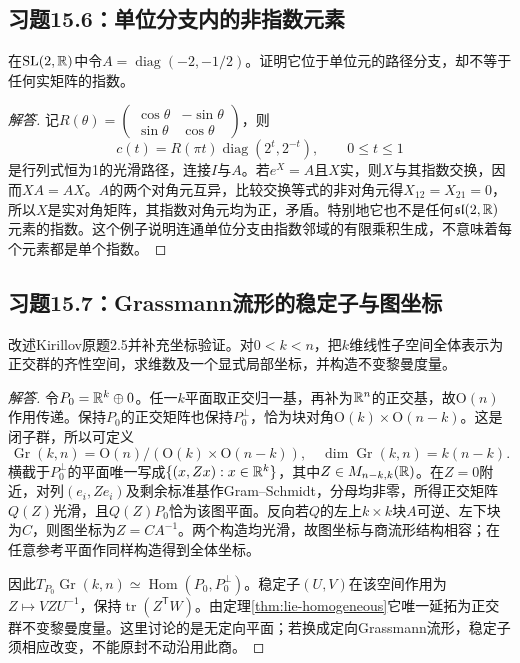 \subsection*{习题15.6：单位分支内的非指数元素}
在$\mathrm{SL}(2,\mathbb{R})$中令$A=\operatorname{diag}(-2,-1/2)$。证明它位于单位元的路径分支，却不等于任何实矩阵的指数。
\begin{proof}[解答]
记$R(\theta)=\left(\begin{smallmatrix}\cos\theta&-\sin\theta\\\sin\theta&\cos\theta\end{smallmatrix}\right)$，则
\[
 c(t)=R(\pi t)\operatorname{diag}(2^t,2^{-t}),\qquad0\le t\le1
\]
是行列式恒为1的光滑路径，连接$I$与$A$。若$e^X=A$且$X$实，则$X$与其指数交换，因而$XA=AX$。$A$的两个对角元互异，比较交换等式的非对角元得$X_{12}=X_{21}=0$，所以$X$是实对角矩阵，其指数对角元均为正，矛盾。特别地它也不是任何$\mathfrak{sl}(2,\mathbb{R})$元素的指数。这个例子说明连通单位分支由指数邻域的有限乘积生成，不意味着每个元素都是单个指数。
\end{proof}

\subsection*{习题15.7：Grassmann流形的稳定子与图坐标}
改述Kirillov原题2.5并补充坐标验证。对$0<k<n$，把$k$维线性子空间全体表示为正交群的齐性空间，求维数及一个显式局部坐标，并构造不变黎曼度量。
\begin{proof}[解答]
令$P_0=\mathbb{R}^k\oplus0$。任一$k$平面取正交归一基，再补为$\mathbb{R}^n$的正交基，故$\mathrm O(n)$作用传递。保持$P_0$的正交矩阵也保持$P_0^\perp$，恰为块对角$\mathrm O(k)\times\mathrm O(n-k)$。这是闭子群，所以可定义
\[
 \operatorname{Gr}(k,n)=\mathrm O(n)/(\mathrm O(k)\times\mathrm O(n-k)),
 \quad \dim\operatorname{Gr}(k,n)=k(n-k).
\]
横截于$P_0^\perp$的平面唯一写成$\{(x,Zx):x\in\mathbb{R}^k\}$，其中$Z\in M_{n-k,k}(\mathbb{R})$。在$Z=0$附近，对列$(e_i,Ze_i)$及剩余标准基作Gram--Schmidt，分母均非零，所得正交矩阵$Q(Z)$光滑，且$Q(Z)P_0$恰为该图平面。反向若$Q$的左上$k\times k$块$A$可逆、左下块为$C$，则图坐标为$Z=CA^{-1}$。两个构造均光滑，故图坐标与商流形结构相容；在任意参考平面作同样构造得到全体坐标。

因此$T_{P_0}\operatorname{Gr}(k,n)\simeq\operatorname{Hom}(P_0,P_0^\perp)$。稳定子$(U,V)$在该空间作用为$Z\mapsto VZU^{-1}$，保持$\operatorname{tr}(Z^{\mathsf T}W)$。由定理\ref{thm:lie-homogeneous}它唯一延拓为正交群不变黎曼度量。这里讨论的是无定向平面；若换成定向Grassmann流形，稳定子须相应改变，不能原封不动沿用此商。
\end{proof}


